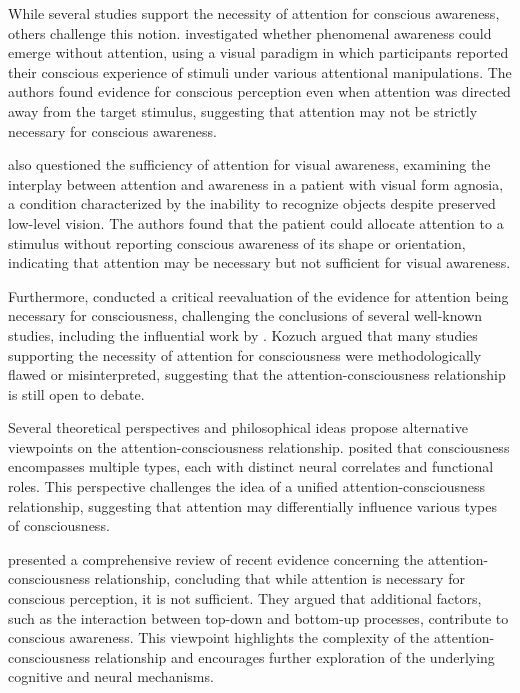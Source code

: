 \documentclass[10pt]{article}
\begin{document}
\begin{sloppypar}
  While several studies support the necessity of attention for conscious awareness, others challenge this notion. \cite{aru_phenomenal_2013} investigated whether phenomenal awareness could emerge without attention, using a visual paradigm in which participants reported their conscious experience of stimuli under various attentional manipulations. The authors found evidence for conscious perception even when attention was directed away from the target stimulus, suggesting that attention may not be strictly necessary for conscious awareness.

  \cite{kentridge_attended_2008} also questioned the sufficiency of attention for visual awareness, examining the interplay between attention and awareness in a patient with visual form agnosia, a condition characterized by the inability to recognize objects despite preserved low-level vision. The authors found that the patient could allocate attention to a stimulus without reporting conscious awareness of its shape or orientation, indicating that attention may be necessary but not sufficient for visual awareness.

  Furthermore, \cite{kozuch_gorillas_2018} conducted a critical reevaluation of the evidence for attention being necessary for consciousness, challenging the conclusions of several well-known studies, including the influential work by \cite{cohen_attentional_2012}. Kozuch argued that many studies supporting the necessity of attention for consciousness were methodologically flawed or misinterpreted, suggesting that the attention-consciousness relationship is still open to debate.

  Several theoretical perspectives and philosophical ideas propose alternative viewpoints on the attention-consciousness relationship. \cite{montemayor_types_2021} posited that consciousness encompasses multiple types, each with distinct neural correlates and functional roles. This perspective challenges the idea of a unified attention-consciousness relationship, suggesting that attention may differentially influence various types of consciousness.

  \cite{noah_recent_2020} presented a comprehensive review of recent evidence concerning the attention-consciousness relationship, concluding that while attention is necessary for conscious perception, it is not sufficient. They argued that additional factors, such as the interaction between top-down and bottom-up processes, contribute to conscious awareness. This viewpoint highlights the complexity of the attention-consciousness relationship and encourages further exploration of the underlying cognitive and neural mechanisms.


\end{sloppypar}
\end{document}
